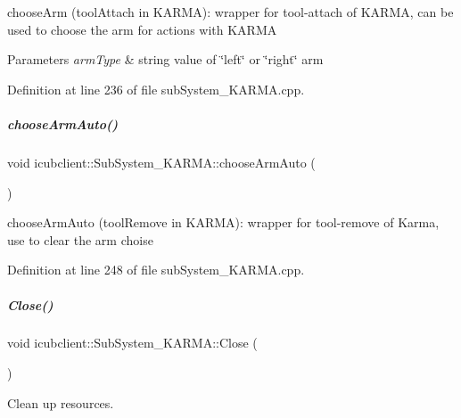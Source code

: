 choose\+Arm (tool\+Attach in K\+A\+R\+MA)\+: wrapper for tool-\/attach of K\+A\+R\+MA, can be used to choose the arm for actions with K\+A\+R\+MA 


\begin{DoxyParams}{Parameters}
{\em arm\+Type} & string value of \char`\"{}left\char`\"{} or \char`\"{}right\char`\"{} arm \\
\hline
\end{DoxyParams}


Definition at line 236 of file sub\+System\+\_\+\+K\+A\+R\+M\+A.\+cpp.

\mbox{\label{group__icubclient__subsystems_a90f064b10e6953a42e58b3b623893551}} 
\subparagraph{\texorpdfstring{choose\+Arm\+Auto()}{chooseArmAuto()}}
{\footnotesize\ttfamily void icubclient\+::\+Sub\+System\+\_\+\+K\+A\+R\+M\+A\+::choose\+Arm\+Auto (\begin{DoxyParamCaption}{ }\end{DoxyParamCaption})}



choose\+Arm\+Auto (tool\+Remove in K\+A\+R\+MA)\+: wrapper for tool-\/remove of Karma, use to clear the arm choise 



Definition at line 248 of file sub\+System\+\_\+\+K\+A\+R\+M\+A.\+cpp.

\mbox{\label{group__icubclient__subsystems_acdec5cffb610e7b93d2d51ac22765b21}} 
\subparagraph{\texorpdfstring{Close()}{Close()}}
{\footnotesize\ttfamily void icubclient\+::\+Sub\+System\+\_\+\+K\+A\+R\+M\+A\+::\+Close (\begin{DoxyParamCaption}{ }\end{DoxyParamCaption})\hspace{0.3cm}{\ttfamily [virtual]}}



Clean up resources. 




